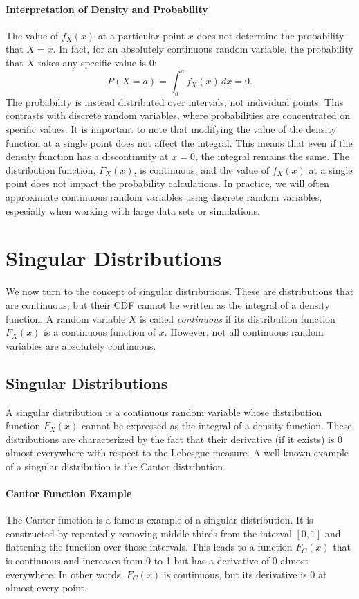     \paragraph{Interpretation of Density and Probability}
    The value of $f_X(x)$ at a particular point $x$ does not determine the probability that $X = x$. In fact, for an absolutely continuous random variable, the probability that $X$ takes any specific value is 0:
    \[
    P(X = a) = \int_{a}^{a} f_X(x) \, dx = 0.
    \]
    The probability is instead distributed over intervals, not individual points. This contrasts with discrete random variables, where probabilities are concentrated on specific values. It is important to note that modifying the value of the density function at a single point does not affect the integral. This means that even if the density function has a discontinuity at $x = 0$, the integral remains the same. The distribution function, $F_X(x)$, is continuous, and the value of $f_X(x)$ at a single point does not impact the probability calculations. \newline
    In practice, we will often approximate continuous random variables using discrete random variables, especially when working with large data sets or simulations.
    
    \section{Singular Distributions}
    We now turn to the concept of singular distributions. These are distributions that are continuous, but their CDF cannot be written as the integral of a density function. A random variable $X$ is called \textit{continuous} if its distribution function $F_X(x)$ is a continuous function of $x$. However, not all continuous random variables are absolutely continuous.
    
    \subsection{Singular Distributions}
    A singular distribution is a continuous random variable whose distribution function $F_X(x)$ cannot be expressed as the integral of a density function. These distributions are characterized by the fact that their derivative (if it exists) is 0 almost everywhere with respect to the Lebesgue measure. A well-known example of a singular distribution is the Cantor distribution.
    
    \paragraph{Cantor Function Example}
    The Cantor function is a famous example of a singular distribution. It is constructed by repeatedly removing middle thirds from the interval $[0, 1]$ and flattening the function over those intervals. This leads to a function $F_C(x)$ that is continuous and increases from 0 to 1 but has a derivative of 0 almost everywhere. In other words, $F_C(x)$ is continuous, but its derivative is 0 at almost every point.
    
